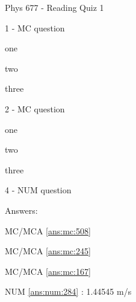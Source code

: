 \documentclass[letterpaper,10pt]{article}
\begin{document}
\begin{center}
{\Large Phys 677 - Reading Quiz 1}
\end{center}


\begin{compactenum}
    \begin{minipage}{\linewidth}
    \item 1 - MC question
    \begin{compactenum}
        \item \label{ans:mc:508}one
        \item two
        \item three
    \end{compactenum}

    \end{minipage}

    \vspace{10pt}

    \begin{minipage}{\linewidth}
    \item 2 - MC question
    \begin{compactenum}
        \item one
        \item \label{ans:mc:245}two
        \item \label{ans:mc:167}three
    \end{compactenum}

    \end{minipage}

    \vspace{10pt}

    \begin{minipage}{\linewidth}
    \item 4 - NUM question

    \label{ans:num:284}

    \end{minipage}

    \vspace{10pt}

\end{compactenum}

\clearpage
Answers:

  MC/MCA \ref{ans:mc:508}

  MC/MCA \ref{ans:mc:245}

  MC/MCA \ref{ans:mc:167}

  NUM \ref{ans:num:284} : 1.44545 m/s
\end{document}
